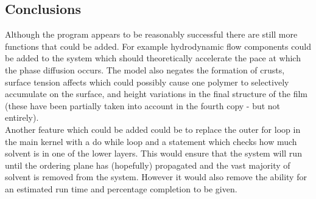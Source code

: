\documentclass{article}
\numberwithin{equation}{section} %
\begin{document}
\subsection{Conclusions}
Although the program appears to be reasonably successful there are still more functions that could be added. For example hydrodynamic flow components could be added to the system which should theoretically accelerate the pace at which the phase diffusion occurs. The model also negates the formation of crusts, surface tension affects which could possibly cause one polymer to selectively accumulate on the surface, and height variations in the final structure of the film (these have been partially taken into account in the fourth copy - but not entirely).  \\  Another feature which could be added could be to replace the outer for loop in the main kernel with a do while loop and a statement which checks how much solvent is in one of the lower layers. This would ensure that the system will run until the ordering plane has (hopefully) propagated and the vast majority of solvent is removed from the system. However it would also remove the ability for an estimated run time and percentage completion to be given. 

%
\end{document}
